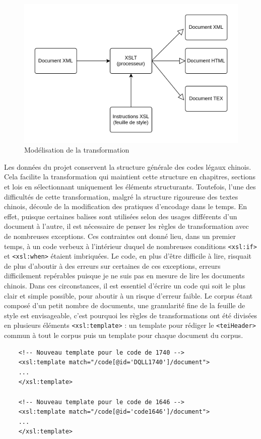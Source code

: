 \begin{figure}
    \centering
    \includegraphics[width=\textwidth]{images/xslt.png}
    \caption{Modélisation de la transformation \XSLT}
\end{figure}
\newpage
Les données du projet \LSC conservent la structure générale des codes légaux chinois. Cela facilite la transformation \XSLT qui maintient cette structure en chapitres, sections et lois en sélectionnant uniquement les éléments structurants. Toutefois, l'une des difficultés de cette transformation, malgré la structure rigoureuse des textes chinois, découle de la modification des pratiques d'encodage dans le temps. En effet, puisque certaines balises sont utilisées selon des usages différents d'un document à l'autre, il est nécessaire de penser les règles de transformation avec de nombreuses exceptions. Ces contraintes ont donné lieu, dans un premier temps, à un code verbeux à l'intérieur duquel de nombreuses conditions \texttt{<xsl:if>} et \texttt{<xsl:when>} étaient imbriquées. Le code, en plus d'être difficile à lire, risquait de plus d'aboutir à des erreurs sur certaines de ces exceptions, erreurs difficilement repérables puisque je ne suis pas en mesure de lire les documents chinois. Dans ces circonstances, il est essentiel d'écrire un code qui soit le plus clair et simple possible, pour aboutir à un risque d'erreur faible. Le corpus étant composé d'un petit nombre de documents, une granularité fine de la feuille de style est envisageable, c'est pourquoi les règles de transformations ont été divisées en plusieurs éléments \texttt{<xsl:template>} : un template pour rédiger le \texttt{<teiHeader>} commun à tout le corpus puis un template pour chaque document du corpus. 

\begin{verbatim}
    <!-- Nouveau template pour le code de 1740 -->
    <xsl:template match="/code[@id='DQLL1740']/document">
    ...
    </xsl:template>

    <!-- Nouveau template pour le code de 1646 -->
    <xsl:template match="/code[@id='code1646']/document">
    ...
    </xsl:template>
\end{verbatim}

